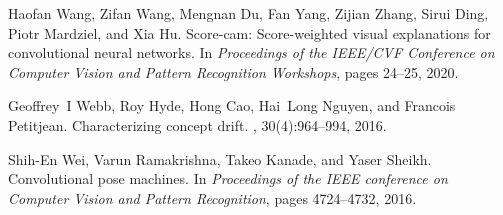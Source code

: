 \documentclass{article}
\begin{document}
\begin{thebibliography}{}
Haofan Wang, Zifan Wang, Mengnan Du, Fan Yang, Zijian Zhang, Sirui Ding, Piotr
  Mardziel, and Xia Hu.
\newblock Score-cam: Score-weighted visual explanations for convolutional
  neural networks.
\newblock In {\em Proceedings of the IEEE/CVF Conference on Computer Vision and
  Pattern Recognition Workshops}, pages 24--25, 2020.

Geoffrey~I Webb, Roy Hyde, Hong Cao, Hai~Long Nguyen, and Francois Petitjean.
\newblock Characterizing concept drift.
, 30(4):964--994, 2016.

Shih-En Wei, Varun Ramakrishna, Takeo Kanade, and Yaser Sheikh.
\newblock Convolutional pose machines.
\newblock In {\em Proceedings of the IEEE conference on Computer Vision and
  Pattern Recognition}, pages 4724--4732, 2016.

\end{thebibliography}
\end{document}
